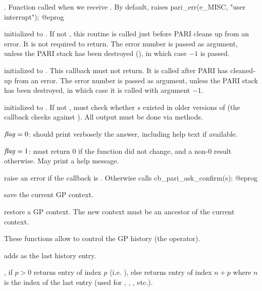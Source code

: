 .
Function called when we receive . By default, raises
\bprog
  pari_err(e_MISC, "user interrupt");
@eprog

initialized to . If not , this routine is called just
before PARI cleans up from an error. It is not required to return.  The error
number is passed as argument, unless the PARI stack has been destroyed
(), in which case $-1$ is passed.

initialized to . This callback must not return.
It is called after PARI has cleaned-up from an error. The error number is
passed as argument, unless the PARI stack has been destroyed, in which case
it is called with argument $-1$.

 initialized to . If not , must check whether $s$
existed in older versions of  (the  callback checks against
). All output must be done via  methods.

\item $\hbox{\it f\kern0pt lag\/} = 0$: should print verbosely the answer, including help text if
available.

\item $\hbox{\it f\kern0pt lag\/} = 1$: must return $0$ if the function did not change, and a
non-$0$ result otherwise. May print a help message.


 raise an error if the
callback  is . Otherwise
calls
\bprog
  cb_pari_ask_confirm(s);
@eprog

 save the current GP
context.

 restore a GP context.
The new context must be an ancestor of the current context.


These functions allow to control the GP history (the \kbd{\%} operator).

 adds  as the last history entry.

, if $p>0$ returns entry of index $p$
(i.e. ), else returns entry of index $n+p$ where $n$ is the
index of the last entry (used for \kbd{\%}, , , etc.).

